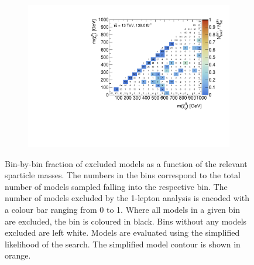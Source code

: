 \begin{figure}
\begin{subfigure}[b]{0.5\linewidth}
		\centering\includegraphics[width=\textwidth]{cut_none/mchi1p_mchi20_contour}
		\caption{\label{fig:mchi1p_mchi20_contour}}
	\end{subfigure}\hfill
	\caption{Bin-by-bin fraction of excluded models as a function of the relevant sparticle masses. The numbers in the bins correspond to the total number of models sampled falling into the respective bin. The number of models excluded by the 1-lepton analysis is encoded with a colour bar ranging from 0 to 1. Where all models in a given bin are excluded, the bin is coloured in black. Bins without any models excluded are left white. Models are evaluated using the simplified likelihood of the \onelepton search. The simplified model contour is shown in orange.}
	\label{fig:impact_electroweakinos_2D}
\end{figure}


